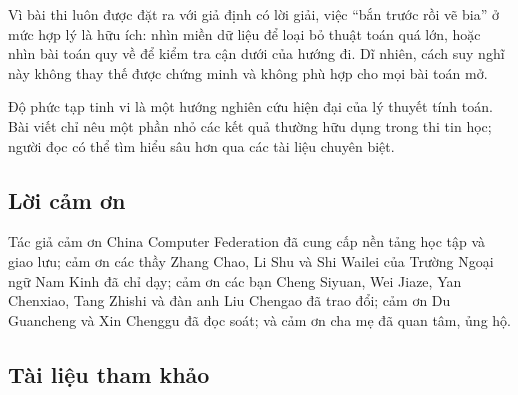 \documentclass[11pt]{article}
\begin{document}
Vì bài thi luôn được đặt ra với giả định có lời giải, việc ``bắn trước rồi vẽ
bia'' ở mức hợp lý là hữu ích: nhìn miền dữ liệu để loại bỏ thuật toán quá lớn,
hoặc nhìn bài toán quy về để kiểm tra cận dưới của hướng đi. Dĩ nhiên, cách suy
nghĩ này không thay thế được chứng minh và không phù hợp cho mọi bài toán mở.

Độ phức tạp tinh vi là một hướng nghiên cứu hiện đại của lý thuyết tính toán.
Bài viết chỉ nêu một phần nhỏ các kết quả thường hữu dụng trong thi tin học;
người đọc có thể tìm hiểu sâu hơn qua các tài liệu chuyên biệt.

\subsection*{Lời cảm ơn}

Tác giả cảm ơn China Computer Federation đã cung cấp nền tảng học tập và giao
lưu; cảm ơn các thầy Zhang Chao, Li Shu và Shi Wailei của Trường Ngoại ngữ Nam
Kinh đã chỉ dạy; cảm ơn các bạn Cheng Siyuan, Wei Jiaze, Yan Chenxiao, Tang
Zhishi và đàn anh Liu Chengao đã trao đổi; cảm ơn Du Guancheng và Xin Chenggu
đã đọc soát; và cảm ơn cha mẹ đã quan tâm, ủng hộ.

\subsection*{Tài liệu tham khảo}
\end{document}

